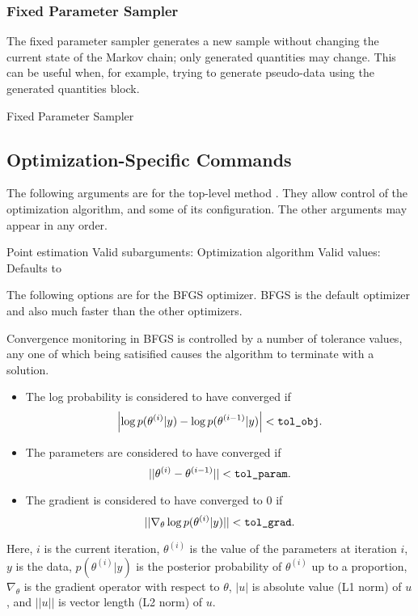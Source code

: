 \subsubsection{Fixed Parameter Sampler}

The fixed parameter sampler generates a new sample without changing
the current state of the Markov chain; only generated quantities may
change.  This can be useful when, for example, trying to generate pseudo-data 
using the generated quantities block.
%
\begin{description}
        {Fixed Parameter Sampler}
\end{description}

\subsection{Optimization-Specific Commands}

The following arguments are for the top-level method .
They allow control of the optimization algorithm, and some of its
configuration.  The other arguments may appear in any order.

\begin{description}
%
    {Point estimation}
    {Valid subarguments: }
%
      {Optimization algorithm}
      {Valid values: \  }
      {Defaults to }
\end{description}
%
The following options are for the BFGS optimizer.  BFGS is the default
optimizer and also much faster than the other optimizers.  

Convergence monitoring in BFGS is controlled by a number of tolerance
values, any one of which being satisified causes the algorithm to
terminate with a solution.
%
\begin{itemize}
\item The log probability is considered to have converged if
\[
\left| \log p(\theta^{(i)}|y) - \log p(\theta^{(i-1)}|y) \right| <
\mbox{\code{tol\_obj}}.
\]
\item The parameters are considered to have converged if
%
\\
\[
|| \theta^{(i)} - \theta^{(i-1)} || < \mbox{\code{tol\_param}}.
\]
%
\item The gradient is considered to have converged to 0 if 
\[
|| \nabla_{\theta} \log p(\theta^{(i)}|y) || < \mbox{\code{tol\_grad}}.
\]
\end{itemize}
%
Here, $i$ is the current iteration, $\theta^{(i)}$ is the value of the
parameters at iteration $i$, $y$ is the data, $p(\theta^{(i)}|y)$ is
the posterior probability of $\theta^{(i)}$ up to a proportion,
$\nabla_{\theta}$ is the gradient operator with respect to $\theta$,
$|u|$ is absolute value (L1 norm) of $u$, and $||u||$ is vector length
(L2 norm) of $u$.

